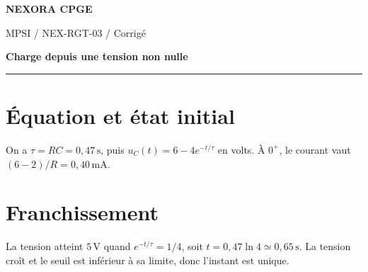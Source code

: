 \documentclass[11pt,a4paper]{article}
\begin{document}
{\small\bfseries\color{nexorablue} NEXORA CPGE}\par
{\small MPSI / NEX-RGT-03 / Corrigé}\par
{\LARGE\bfseries Charge depuis une tension non nulle}\par
\vspace{0.25em}\hrule\vspace{0.6em}

\section*{Équation et état initial}
On a $\tau=RC=0{,}47\,\mathrm s$, puis $u_C(t)=6-4e^{-t/\tau}$ en volts. À $0^+$, le courant vaut $(6-2)/R=0{,}40\,\mathrm{mA}$.

\section*{Franchissement}
La tension atteint $5\,\mathrm V$ quand $e^{-t/\tau}=1/4$, soit $t=0{,}47\ln4\simeq0{,}65\,\mathrm s$. La tension croît et le seuil est inférieur à sa limite, donc l’instant est unique.
\end{document}
